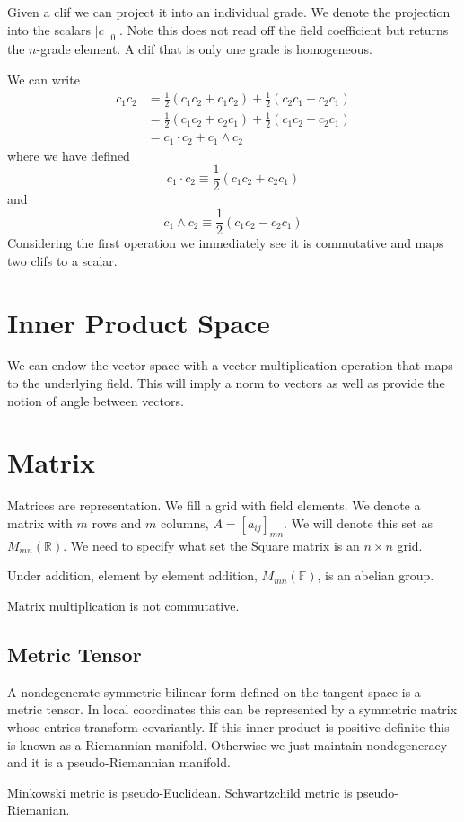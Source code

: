 \documentclass[a4paper]{scrartcl}
\begin{document}
Given a clif we can project it into an individual grade. We denote the projection into the scalars $\mid c \mid_{0}$. Note this does not read off the field coefficient but returns the $n$-grade element.
A clif that is only one grade is homogeneous.

We can write
\begin{align*}
c_{1}c_{2} & = \frac{1}{2}(c_{1}c_{2} + c_{1}c_{2}) + \frac{1}{2}(c_{2}c_{1} - c_{2}c_{1})\\
& = \frac{1}{2}(c_{1}c_{2} + c_{2}c_{1}) + \frac{1}{2}(c_{1}c_{2} - c_{2}c_{1}) \\
& = c_{1}\cdot c_{2} + c_{1}\wedge c_{2}
\end{align*}
where we have defined
$$c_{1}\cdot c_{2} \equiv \frac{1}{2}(c_{1}c_{2} + c_{2}c_{1})$$
and
$$c_{1}\wedge c_{2} \equiv \frac{1}{2}(c_{1}c_{2} - c_{2}c_{1})$$
Considering the first operation we immediately see it is commutative and maps two clifs to a scalar. 

\section{Inner Product Space}
We can endow the vector space with a vector multiplication operation that maps to the underlying field. This will imply a norm to vectors as well as provide the notion of angle between vectors.



\section{Matrix}
Matrices are representation. We fill a grid with field elements.
We denote a matrix with $m$ rows and $m$ columns, $A=[a_{ij}]_{mn}$. We will denote this set as $M_{mn}(\mathbb{R})$. We need to specify what set the 
Square matrix is an $n\times n$ grid. 

Under addition, element by element addition, $M_{mn}(\mathbb{F})$, is an abelian group.

Matrix multiplication is not commutative.





\subsection{Metric Tensor}
A nondegenerate symmetric bilinear form defined on the tangent space is a metric tensor. In local coordinates this can be represented by a symmetric matrix whose entries transform covariantly. If this inner product is positive definite this is known as a Riemannian manifold. Otherwise we just maintain nondegeneracy and it is a pseudo-Riemannian manifold.

Minkowski metric is pseudo-Euclidean. Schwartzchild metric is pseudo-Riemanian.
\end{document}
